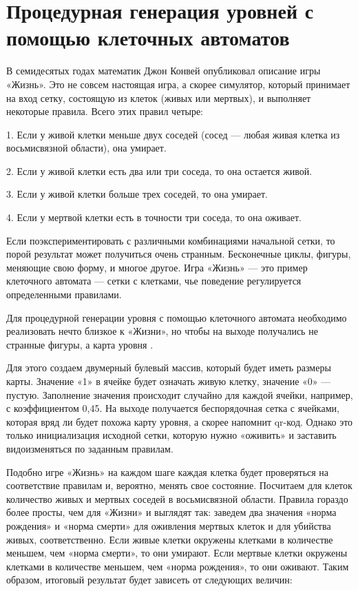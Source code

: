 \documentclass[a4paper,12pt]{report}
\begin{document}
\section{Процедурная генерация уровней с помощью клеточных автоматов}

В семидесятых годах математик Джон Конвей опубликовал описание игры «Жизнь». Это не совсем настоящая игра, а скорее симулятор, который принимает на вход сетку, состоящую из клеток (живых или мертвых), и выполняет некоторые правила. Всего этих правил четыре:

1. Если у живой клетки меньше двух соседей (сосед — любая живая клетка из восьмисвязной области), она умирает.

2. Если у живой клетки есть два или три соседа, то она остается живой.

3. Если у живой клетки больше трех соседей, то она умирает.

4. Если у мертвой клетки есть в точности три соседа, то она оживает.

Если поэкспериментировать с различными комбинациями начальной сетки, то порой результат может получиться очень странным. Бесконечные циклы, фигуры, меняющие свою форму, и многое другое. Игра «Жизнь» — это пример клеточного автомата — сетки с клетками, чье поведение регулируется определенными правилами.

Для процедурной генерации уровня с помощью клеточного автомата необходимо реализовать нечто близкое к «Жизни», но чтобы на выходе получались не странные фигуры, а карта уровня \citep{cellar}.

Для этого создаем двумерный булевый массив, который будет иметь размеры карты. Значение «1» в ячейке будет означать живую клетку, значение «0»  — пустую. Заполнение значения происходит случайно для каждой ячейки, например, с коэффициентом 0,45. На выходе получается беспорядочная сетка с ячейками, которая вряд ли будет похожа карту уровня, а скорее напомнит qr-код. Однако это только инициализация исходной сетки, которую нужно «оживить» и заставить видоизменяться по заданным правилам.

Подобно игре «Жизнь» на каждом шаге каждая клетка будет проверяться на соответствие правилам и, вероятно, менять свое состояние. Посчитаем для клеток количество живых и мертвых соседей в восьмисвязной области. Правила гораздо более просты, чем для «Жизни» и выглядят так: заведем два значения «норма рождения» и «норма смерти» для оживления мертвых клеток и для убийства живых, соответственно. Если живые клетки окружены клетками в количестве меньшем, чем «норма смерти», то они умирают. Если мертвые клетки окружены клетками в количестве меньшем, чем «норма рождения», то они оживают.
Таким образом, итоговый результат будет зависеть от следующих величин:
\end{document}
